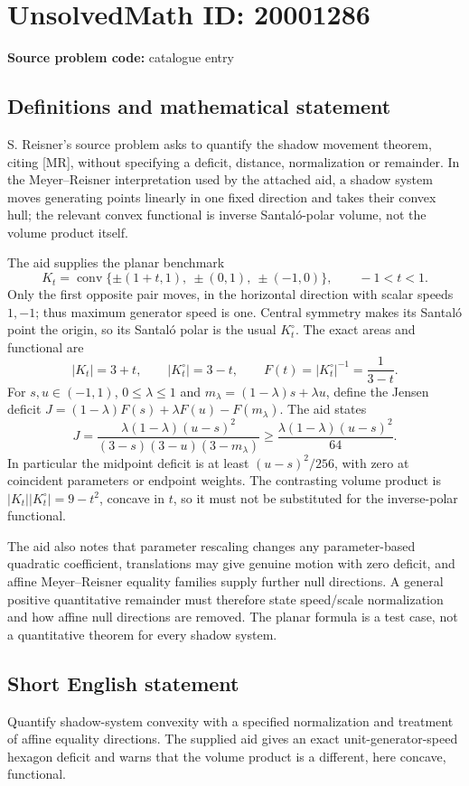 \documentclass[11pt]{article}
\begin{document}
\section*{UnsolvedMath ID: 20001286}
\textbf{Source problem code:} catalogue entry
\subsection{Definitions and mathematical statement}
S. Reisner's source problem asks to quantify the shadow movement theorem, citing [MR], without specifying a deficit, distance, normalization or remainder. In the Meyer--Reisner interpretation used by the attached aid, a shadow system moves generating points linearly in one fixed direction and takes their convex hull; the relevant convex functional is inverse Santal\'o-polar volume, not the volume product itself.

The aid supplies the planar benchmark
\[
K_t=\operatorname{conv}\{\pm(1+t,1),\ \pm(0,1),\ \pm(-1,0)\},\qquad-1<t<1.
\]
Only the first opposite pair moves, in the horizontal direction with scalar speeds $1,-1$; thus maximum generator speed is one. Central symmetry makes its Santal\'o point the origin, so its Santal\'o polar is the usual $K_t^\circ$. The exact areas and functional are
\[
|K_t|=3+t,\qquad |K_t^\circ|=3-t,\qquad F(t)=|K_t^\circ|^{-1}=\frac1{3-t}.
\]
For $s,u\in(-1,1)$, $0\le\lambda\le1$ and $m_\lambda=(1-\lambda)s+\lambda u$, define the Jensen deficit $J=(1-\lambda)F(s)+\lambda F(u)-F(m_\lambda)$. The aid states
\[
J=\frac{\lambda(1-\lambda)(u-s)^2}{(3-s)(3-u)(3-m_\lambda)}
\ge\frac{\lambda(1-\lambda)(u-s)^2}{64}.
\]
In particular the midpoint deficit is at least $(u-s)^2/256$, with zero at coincident parameters or endpoint weights. The contrasting volume product is $|K_t||K_t^\circ|=9-t^2$, concave in $t$, so it must not be substituted for the inverse-polar functional.

The aid also notes that parameter rescaling changes any parameter-based quadratic coefficient, translations may give genuine motion with zero deficit, and affine Meyer--Reisner equality families supply further null directions. A general positive quantitative remainder must therefore state speed/scale normalization and how affine null directions are removed. The planar formula is a test case, not a quantitative theorem for every shadow system.
\subsection{Short English statement}
Quantify shadow-system convexity with a specified normalization and treatment of affine equality directions. The supplied aid gives an exact unit-generator-speed hexagon deficit and warns that the volume product is a different, here concave, functional.
\end{document}
